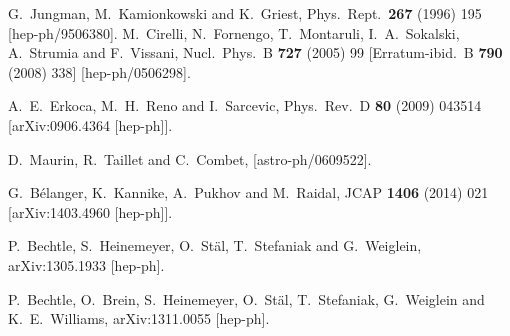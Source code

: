 \documentclass[12pt,a4paper]{article}
\begin{document}
\begin{thebibliography}{}
  G.~Jungman, M.~Kamionkowski and K.~Griest,
  Phys.\ Rept.\  {\bf 267} (1996) 195
  [hep-ph/9506380].
  M.~Cirelli, N.~Fornengo, T.~Montaruli, I.~A.~Sokalski, A.~Strumia and
F.~Vissani,
  Nucl.\ Phys.\ B {\bf 727} (2005) 99
   [Erratum-ibid.\ B {\bf 790} (2008) 338]
  [hep-ph/0506298].


  A.~E.~Erkoca, M.~H.~Reno and I.~Sarcevic,
  Phys.\ Rev.\ D {\bf 80} (2009) 043514
  [arXiv:0906.4364 [hep-ph]].

  D.~Maurin, R.~Taillet and C.~Combet,
  [astro-ph/0609522].

  G.~B\'elanger, K.~Kannike, A.~Pukhov and M.~Raidal,
  JCAP {\bf 1406} (2014) 021
  [arXiv:1403.4960 [hep-ph]].


   P.~Bechtle, S.~Heinemeyer, O.~St\"al, T.~Stefaniak and G.~Weiglein,
   arXiv:1305.1933 [hep-ph].
 
   P.~Bechtle, O.~Brein, S.~Heinemeyer, O.~St\"al, T.~Stefaniak, G.~Weiglein and K.~E.~Williams,
   arXiv:1311.0055 [hep-ph].

\end{thebibliography}
\end{document}
